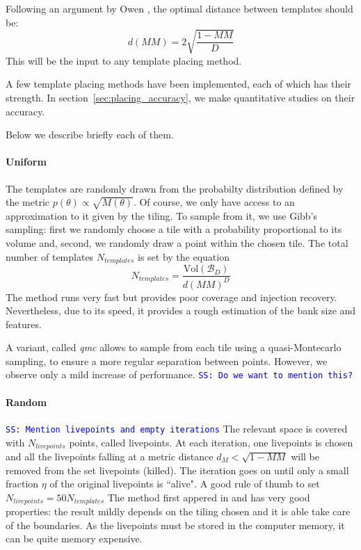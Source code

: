 \documentclass[twocolumn,showpacs,preprintnumbers,nofootinbib,prd,
superscriptaddress,10pt]{revtex4-1}
\newcommand{\stefano}[1]{{\textcolor{blue}{\texttt{SS: #1}} }}
\begin{document}
Following an argument by Owen \cite{owen_metric}, the optimal distance between templates should be:
\begin{equation}
	d(MM) = 2 \sqrt{\frac{1-MM}{D}}
\end{equation}
This will be the input to any template placing method.

A few template placing methods have been implemented, each of which has their strength. In section~\ref{sec:placing_accuracy}, we make quantitative studies on their accuracy.

Below we describe briefly each of them.

\paragraph{Uniform}\label{par:uniform}
The templates are randomly drawn from the probabilty distribution defined by the metric $p(\theta) \propto \sqrt{M(\theta)}$.
Of course, we only have access to an approximation to it given by the tiling. To sample from it, we use Gibb's sampling: first we randomly choose a tile with a probability proportional to its volume and, second, we randomly draw a point within the chosen tile.
The total number of templates $N_{templates}$ is set by the equation
\begin{equation} \label{eq:N_templates}
	N_{templates} = \frac{\text{Vol}(\mathcal{B}_D)}{d(MM)^D}
\end{equation}
The method runs very fast but provides poor coverage and injection recovery. Nevertheless, due to its speed, it provides a rough estimation of the bank size and features.

A variant, called {\it qmc} allows to sample from each tile using a quasi-Montecarlo sampling, to ensure a more regular separation between points. However, we observe only a mild increase of performance.
\stefano{Do we want to mention this?}
\paragraph{Random}\label{par:random}
\stefano{Mention livepoints and empty iterations}
The relevant space is covered with $N_{livepoints}$ points, called livepoints. At each iteration, one livepoints is chosen and all the livepoints falling at a metric distance $d_M<\sqrt{1-MM}$ will be removed from the set livepoints (killed). The iteration goes on until only a small fraction $\eta$ of the original livepoints is ``alive". A good rule of thumb to set $N_{livepoints} = 50 N_{templates}$
The method first appered in \cite{} and has very good properties: the result mildly depends on the tiling chosen and it is able take care of the boundaries. As the livepoints must be stored in the computer memory, it can be quite memory expensive.
\end{document}
